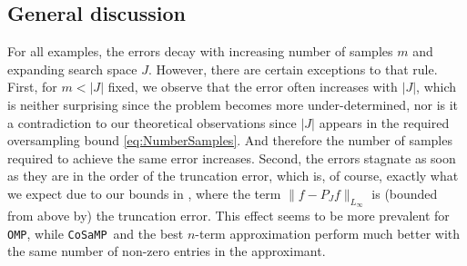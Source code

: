 \documentclass[11pt,reqno, a4paper]{article}
\numberwithin{equation}{section}
\newcommand{\omp}{\texttt{OMP}}
\newcommand{\cosamp}{\texttt{CoSaMP}}
\begin{document}
\begin{figure}[H]
\end{figure}

\subsection{General discussion}
For all examples, the errors decay with increasing number of samples $m$ and expanding search space $J$.
However, there are certain exceptions to that rule. 
First, for $m < \lvert J \rvert$ fixed, we observe that the error often increases with $\lvert J \rvert$, which is neither surprising since the problem becomes more under-determined, nor is it a contradiction to our theoretical observations since $\lvert J \rvert$ appears in the required oversampling bound \eqref{eq:NumberSamples}. And therefore the number of samples required to achieve the same error increases.
Second, the errors stagnate as soon as they are in the order of the truncation error, which is, of course, exactly what we expect due to our bounds in , where the term \(\lVert f-P_Jf\rVert_{L_\infty}\) is (bounded from above by) the truncation error. This effect seems to be more prevalent for \omp, while \cosamp \ and the best \(n\)-term approximation perform much better with the same number of non-zero entries in the approximant.
\end{document}
